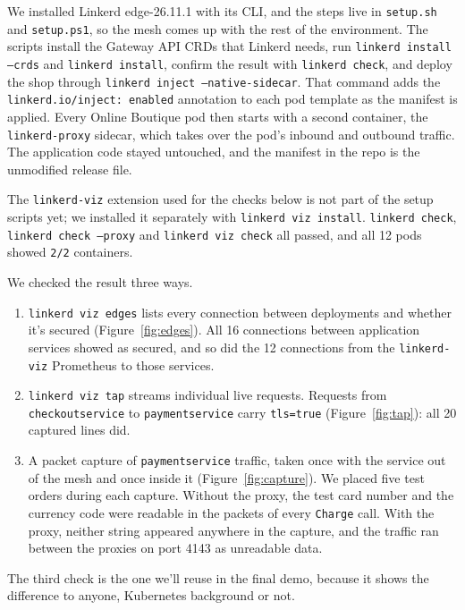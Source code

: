 \documentclass[12pt,a4paper]{article}
\begin{document}
We installed Linkerd edge-26.11.1 with its CLI, and the steps live in
\texttt{setup.sh} and \texttt{setup.ps1}, so the mesh comes up with the rest of
the environment. The scripts install the Gateway API CRDs that Linkerd needs,
run \texttt{linkerd install --crds} and \texttt{linkerd install}, confirm the
result with \texttt{linkerd check}, and deploy the shop through
\texttt{linkerd inject --native-sidecar}. That command adds the
\texttt{linkerd.io/inject: enabled} annotation to each pod template as the
manifest is applied. Every Online Boutique pod then starts with a second
container, the \texttt{linkerd-proxy} sidecar, which takes over the pod's
inbound and outbound traffic. The application code stayed untouched, and the
manifest in the repo is the unmodified release file.

The \texttt{linkerd-viz} extension used for the checks below is not part of
the setup scripts yet; we installed it separately with
\texttt{linkerd viz install}. \texttt{linkerd check}, \texttt{linkerd check
--proxy} and \texttt{linkerd viz check} all passed, and all 12 pods showed
\texttt{2/2} containers.

We checked the result three ways.

\begin{enumerate}[itemsep=2pt]
  \item \texttt{linkerd viz edges} lists every connection between deployments
    and whether it's secured (Figure~\ref{fig:edges}). All 16 connections
    between application services showed as secured, and so did the 12
    connections from the \texttt{linkerd-viz} Prometheus to those services.
  \item \texttt{linkerd viz tap} streams individual live requests. Requests
    from \texttt{checkoutservice} to \texttt{paymentservice} carry
    \texttt{tls=true} (Figure~\ref{fig:tap}): all 20 captured lines did.
  \item A packet capture of \texttt{paymentservice} traffic, taken once with
    the service out of the mesh and once inside it
    (Figure~\ref{fig:capture}). We placed five test orders during each
    capture. Without the proxy, the test card number and the currency code
    were readable in the packets of every \texttt{Charge} call. With the proxy,
    neither string appeared anywhere in the capture, and the traffic ran
    between the proxies on port 4143 as unreadable data.
\end{enumerate}

The third check is the one we'll reuse in the final demo, because it shows
the difference to anyone, Kubernetes background or not.
\end{document}
